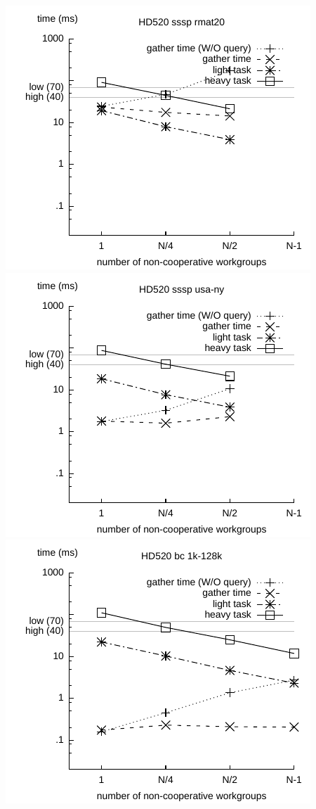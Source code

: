 \documentclass[sigconf]{acmart}
\begin{document}
{\includegraphics[width=.7\columnwidth]{images/barrier/hd520_sssp_rmat20.pdf} \\
\includegraphics[width=.7\columnwidth]{images/barrier/hd520_sssp_usa_ny.pdf} \\
\includegraphics[width=.7\columnwidth]{images/barrier/hd520_bc_1k_128k.pdf} \\
}
\end{document}
